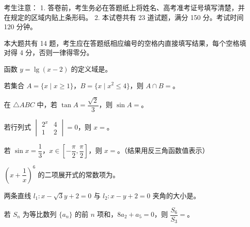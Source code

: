 

考生注意：
1. 答卷前，考生务必在答题纸上将姓名、高考准考证号填写清楚，并在规定的区域内贴上条形码。
2. 本试卷共有 23 道试题，满分 150 分。考试时间 120 分钟。


本大题共有 14 题，考生应在答题纸相应编号的空格内直接填写结果，每个空格填对得 4 分，否则一律得零分。

\begin{question}
函数 $y=\lg(x-2)$ 的定义域是\gkblank{}。

\end{question}
\begin{question}
若集合 $A=\{x\mid x\geqslant1\}$，$B=\{x\mid x^2\leqslant4\}$，则 $A\cap B=$\gkblank{}。

\end{question}
\begin{question}
在 $\triangle ABC$ 中，若 $\tan A=\dfrac{\sqrt2}3$，则 $\sin A=$\gkblank{}。

\end{question}
\begin{question}
若行列式 $\begin{vmatrix}2^x&4\\ 1&2\end{vmatrix}=0$，则 $x=$\gkblank{}。

\end{question}
\begin{question}
若 $\sin x=\dfrac13$，$x\in\left[-\dfrac\pi2,\dfrac\pi2\right]$，则 $x=$\gkblank{}。（结果用反三角函数值表示）

\end{question}
\begin{question}
$\left(x+\dfrac1x\right)^6$ 的二项展开式的常数项为\gkblank{}。

\end{question}
\begin{question}
两条直线 $l_1:x-\sqrt3y+2=0$ 与 $l_2:x-y+2=0$ 夹角的大小是\gkblank{}。

\end{question}
\begin{question}
若 $S_n$ 为等比数列 $\{a_n\}$ 的前 $n$ 项和，$8a_2+a_5=0$，则 $\dfrac{S_6}{S_3}=$\gkblank{}。

\end{question}
